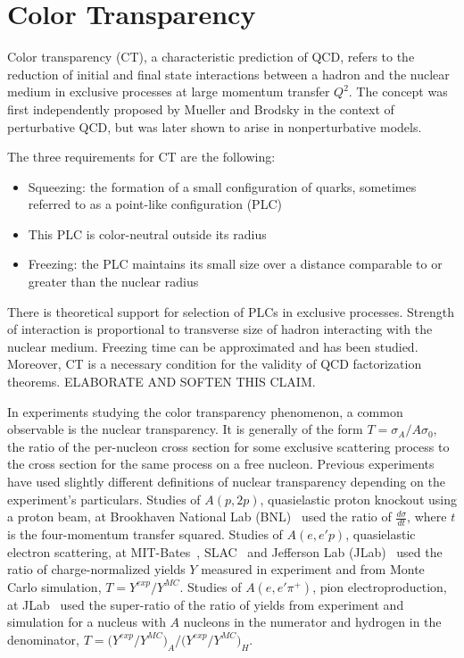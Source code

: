\section{Color Transparency}
Color transparency (CT), a characteristic prediction of QCD, refers to the
reduction of initial and final state interactions between a hadron and the
nuclear medium in exclusive processes at large momentum transfer $Q^2$.
The concept was first independently proposed by Mueller and Brodsky in the
context of perturbative QCD, but was later shown to arise in nonperturbative
models.


The three requirements for CT are the following:
\begin{itemize}
    \item Squeezing: the formation of a small configuration of quarks, sometimes
          referred to as a point-like configuration (PLC)
    \item This PLC is color-neutral outside its radius
    \item Freezing: the PLC maintains its small size over a distance comparable
          to or greater than the nuclear radius
\end{itemize}
There is theoretical support for selection of PLCs in exclusive processes.
Strength of interaction is proportional to transverse size of hadron interacting
with the nuclear medium.
Freezing time can be approximated and has been studied.
Moreover, CT is a necessary condition for the validity of QCD factorization
theorems.
ELABORATE AND SOFTEN THIS CLAIM.




In experiments studying the color transparency phenomenon, a common observable
is the nuclear transparency.
It is generally of the form $T=\sigma_A/A\sigma_0$,
the ratio of
the per-nucleon cross section for some exclusive scattering process
to
the cross section for the same process on a free nucleon.
Previous experiments have used slightly different definitions of nuclear
transparency depending on the experiment's particulars.
Studies of $A(p,2p)$, quasielastic proton knockout using a proton beam,
at Brookhaven National Lab (BNL)~\cite{Carroll_1988, Mardor_1998, Leksanov_2001, Aclander_2004}
used the ratio of $\frac{d\sigma}{dt}$,
where $t$ is the four-momentum transfer squared.
Studies of $A(e,e'p)$, quasielastic electron scattering,
at MIT-Bates~\cite{Garino_1992},
SLAC~\cite{Makins_1994, ONeill_1995}
and Jefferson Lab (JLab)~\cite{Abbot_1998, Garrow_2002, Rohe_2005}
used the ratio of charge-normalized yields $Y$ measured in experiment
and from Monte Carlo simulation, $T=Y^{exp}/Y^{MC}$.
Studies of $A(e,e'\pi^+)$, pion electroproduction,
at JLab~\cite{Clasie_2007, Qian_2010}
used the super-ratio of the ratio of yields from experiment and simulation
for a nucleus with $A$ nucleons in the numerator and hydrogen in the
denominator,
$T= \big(Y^{exp}/Y^{MC}\big)_{A} / \big(Y^{exp}/Y^{MC}\big)_{H}$.


